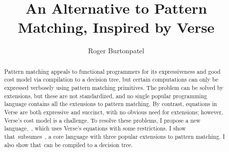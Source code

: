\documentclass[manuscript,screen 12pt, nonacm]{acmart}
\begin{document}
\title{An Alternative to Pattern Matching, Inspired by Verse}

\author{Roger Burtonpatel}



\renewcommand{\shortauthors}{Burtonpatel}

\begin{abstract}
Pattern matching appeals to functional programmers for its expressiveness and
good cost model via compilation to a decision tree, but certain computations can
only be expressed verbosely using pattern matching primitives. The problem can
be solved by extensions, but these are not standardized, and no single popular
programming language contains all the extensions to pattern matching. By
contrast, equations in Verse are both expressive and succinct, with no obvious
need for extensions; however, Verse's cost model is a challenge. To resolve
these problems, I propose a new language,~\VMinus, which uses Verse's equations
with some restrictions. I show that~\VMinus subsumes~\PPlus, a core language
with three popular extensions to pattern matching. I also show that~\VMinus can
be compiled to a decision tree. 
\end{abstract}

\end{document}
